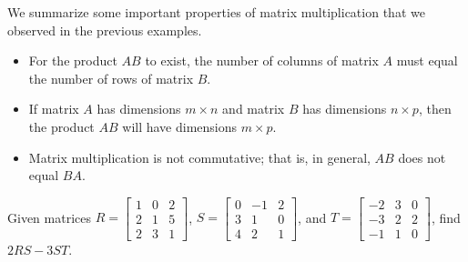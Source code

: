 \begin{solution}
\begin{enumerate}
    \end{enumerate}
\end{solution}

We summarize some important properties of matrix multiplication that we observed in the previous examples.
\begin{itemize}
    \item For the product $AB$ to exist, the number of columns of matrix $A$ must equal the number of rows of matrix $B$.
    \item If matrix $A$ has dimensions $m \times n$ and matrix $B$ has dimensions $n \times p$, then the product $AB$ will have dimensions $m \times p$.
    \item Matrix multiplication is not commutative; that is, in general, $AB$ does not equal $BA$.
\end{itemize}

\begin{example}
    Given matrices $R = \begin{bmatrix} 1 & 0 & 2 \\ 2 & 1 & 5 \\ 2 & 3 & 1 \end{bmatrix}$, $S = \begin{bmatrix} 0 & -1 & 2 \\ 3 & 1 & 0 \\ 4 & 2 & 1 \end{bmatrix}$, and $T = \begin{bmatrix} -2 & 3 & 0 \\ -3 & 2 & 2 \\ -1 & 1 & 0 \end{bmatrix}$, find $2RS - 3ST$.
\end{example}

